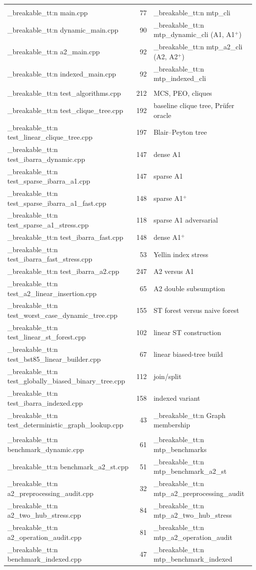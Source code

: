 \documentclass[11pt,a4paper,oneside]{report}
\theoremstyle{plain}
\theoremstyle{definition}
\theoremstyle{remark}
\DeclareRobustCommand{\code}[1]{\mtp_breakable_tt:n {#1}}
\DeclareRobustCommand{\file}[1]{\mtp_breakable_tt:n {#1}}
\begin{document}
\begin{longtable}{@{}>{\raggedright\arraybackslash}p{}r>{\raggedright\arraybackslash}p{}@{}}
\midrule
\multicolumn{3}{@{}l}{\emph{Programs (\code{src/})}}\\
\file{main.cpp} & 77 & \code{mtp_cli}\\
\file{dynamic_main.cpp} & 90 & \code{mtp_dynamic_cli} (A1, A1\(^+\))\\
\file{a2_main.cpp} & 92 & \code{mtp_a2_cli} (A2, A2\(^+\))\\
\file{indexed_main.cpp} & 92 & \code{mtp_indexed_cli}\\
\midrule
\multicolumn{3}{@{}l}{\emph{Tests (\code{tests/})}}\\
\file{test_algorithms.cpp} & 212 & MCS, PEO, cliques\\
\file{test_clique_tree.cpp} & 192 & baseline clique tree, Prüfer oracle\\
\file{test_linear_clique_tree.cpp} & 197 & Blair--Peyton tree\\
\file{test_ibarra_dynamic.cpp} & 147 & dense A1\\
\file{test_sparse_ibarra_a1.cpp} & 147 & sparse A1\\
\file{test_sparse_ibarra_a1_fast.cpp} & 148 & sparse A1\(^+\)\\
\file{test_sparse_a1_stress.cpp} & 118 & sparse A1 adversarial\\
\file{test_ibarra_fast.cpp} & 148 & dense A1\(^+\)\\
\file{test_ibarra_fast_stress.cpp} & 53 & Yellin index stress\\
\file{test_ibarra_a2.cpp} & 247 & A2 versus A1\\
\file{test_a2_linear_insertion.cpp} & 65 & A2 double subsumption\\
\file{test_worst_case_dynamic_tree.cpp} & 155 & ST forest versus naive forest\\
\file{test_linear_st_forest.cpp} & 102 & linear ST construction\\
\file{test_bst85_linear_builder.cpp} & 67 & linear biased-tree build\\
\file{test_globally_biased_binary_tree.cpp} & 112 & join/split\\
\file{test_ibarra_indexed.cpp} & 158 & indexed variant\\
\file{test_deterministic_graph_lookup.cpp} & 43 & \code{Graph} membership\\
\midrule
\multicolumn{3}{@{}l}{\emph{Benchmarks (\code{benchmarks/})}}\\
\file{benchmark_dynamic.cpp} & 61 & \code{mtp_benchmarks}\\
\file{benchmark_a2_st.cpp} & 51 & \code{mtp_benchmark_a2_st}\\
\file{a2_preprocessing_audit.cpp} & 32 & \code{mtp_a2_preprocessing_audit}\\
\file{a2_two_hub_stress.cpp} & 84 & \code{mtp_a2_two_hub_stress}\\
\file{a2_operation_audit.cpp} & 81 & \code{mtp_a2_operation_audit}\\
\file{benchmark_indexed.cpp} & 47 & \code{mtp_benchmark_indexed}\\
\end{longtable}
\end{document}
